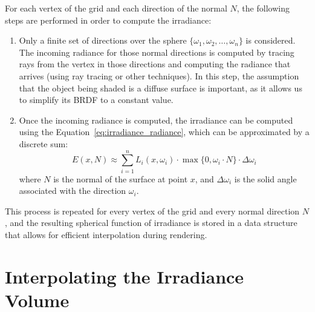 For each vertex of the grid and each direction of the normal $N$, the following steps are performed in order to compute the irradiance:
\begin{enumerate}
    \item Only a finite set of directions over the sphere $\{\omega_1, \omega_2, \ldots, \omega_n\}$ is considered. The incoming radiance for those normal directions is computed by tracing rays from the vertex in those directions and computing the radiance that arrives (using ray tracing or other techniques). In this step, the assumption that the object being shaded is a diffuse surface is important, as it allows us to simplify its BRDF to a constant value.
    \item Once the incoming radiance is computed, the irradiance can be computed using the Equation~\ref{eq:irradiance_radiance}, which can be approximated by a discrete sum:
    \begin{equation*}
    E(x,N) \approx \sum_{i=1}^{n} L_i(x, \omega_i) \cdot \max\{0, \omega_i \cdot N\} \cdot \Delta\omega_i
    \end{equation*}
    where $N$ is the normal of the surface at point $x$, and $\Delta\omega_i$ is the solid angle associated with the direction $\omega_i$.
\end{enumerate}

This process is repeated for every vertex of the grid and every normal direction $N$, and the resulting spherical function of irradiance is stored in a data structure that allows for efficient interpolation during rendering.

\section{Interpolating the Irradiance Volume}

